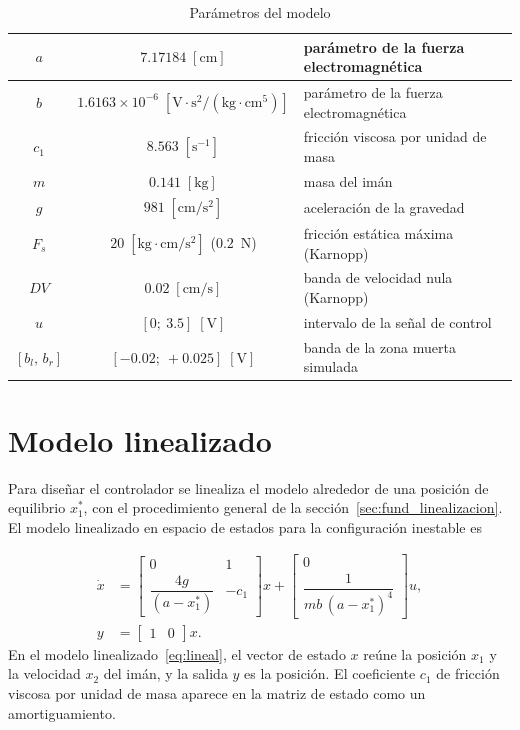 \begin{table}[ht]
\centering
\caption{Parámetros del modelo}
\label{tab:parametros}
\begin{tabular}{|c|c|l|}
\hline
$a$ & $7.17184\;[\text{cm}]$ & parámetro de la fuerza electromagnética \\ \hline
$b$ & $1.6163 \times 10^{-6}\;[\text{V}\cdot\text{s}^2/(\text{kg}\cdot\text{cm}^5)]$ & parámetro de la fuerza electromagnética \\ \hline
$c_1$ & $8.563\;[\text{s}^{-1}]$ & fricción viscosa por unidad de masa \\ \hline
$m$ & $0.141\;[\text{kg}]$ & masa del imán \\ \hline
$g$ & $981\;[\text{cm}/\text{s}^2]$ & aceleración de la gravedad \\ \hline
$F_s$ & $20\;[\text{kg}\cdot\text{cm}/\text{s}^2]$ ($0.2$~N) & fricción estática máxima (Karnopp) \\ \hline
$DV$ & $0.02\;[\text{cm}/\text{s}]$ & banda de velocidad nula (Karnopp) \\ \hline
$u$ & $[0;\ 3.5]\;[\text{V}]$ & intervalo de la señal de control \\ \hline
$[b_l,\,b_r]$ & $[-0.02;\ +0.025]\;[\text{V}]$ & banda de la zona muerta simulada \\ \hline
\end{tabular}
\end{table}

\section{Modelo linealizado}\label{sec:linealizado}

Para diseñar el controlador se linealiza el modelo alrededor de una posición de equilibrio $x_1^{\ast}$, con el procedimiento general de la sección~\ref{sec:fund_linealizacion}. El modelo linealizado en espacio de estados para la configuración inestable es

\begin{equation}
\begin{aligned}
\dot{x}
&=
\begin{bmatrix}
0 & 1 \\[6pt]
\dfrac{4g}{(a-x_1^{\ast})} & -c_1
\end{bmatrix}x
+
\begin{bmatrix}
0 \\[6pt]
\dfrac{1}{mb\,(a-x_1^{\ast})^4}
\end{bmatrix}u,
\\[10pt]
y &= \begin{bmatrix} 1 & 0 \end{bmatrix} x .
\end{aligned}
\label{eq:lineal}
\end{equation}
En el modelo linealizado~\eqref{eq:lineal}, el vector de estado $x$ reúne la posición $x_1$ y la velocidad $x_2$ del imán, y la salida $y$ es la posición. El coeficiente $c_1$ de fricción viscosa por unidad de masa aparece en la matriz de estado como un amortiguamiento.

